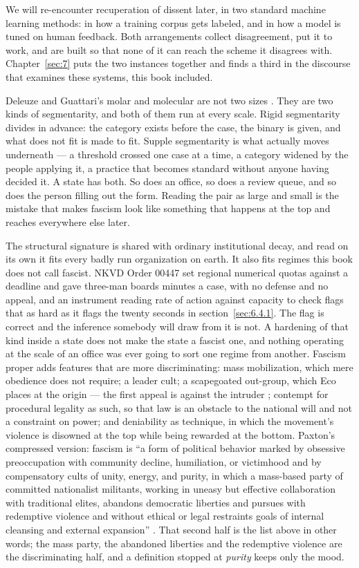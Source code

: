 We will re-encounter recuperation of dissent later, in two standard machine learning methods: in how a training corpus gets labeled, and in how a model is tuned on human feedback. Both arrangements collect disagreement, put it to work, and are built so that none of it can reach the scheme it disagrees with. Chapter~\ref{sec:7} puts the two instances together and finds a third in the discourse that examines these systems, this book included.

Deleuze and Guattari's molar and molecular are not two sizes \autocite{deleuze1987plateaus}. They are two kinds of segmentarity, and both of them run at every scale. Rigid segmentarity divides in advance: the category exists before the case, the binary is given, and what does not fit is made to fit. Supple segmentarity is what actually moves underneath — a threshold crossed one case at a time, a category widened by the people applying it, a practice that becomes standard without anyone having decided it. A state has both. So does an office, so does a review queue, and so does the person filling out the form. Reading the pair as large and small is the mistake that makes fascism look like something that happens at the top and reaches everywhere else later.

The structural signature is shared with ordinary institutional decay, and read on its own it fits every badly run organization on earth. It also fits regimes this book does not call fascist. NKVD Order 00447 set regional numerical quotas against a deadline and gave three-man boards minutes a case, with no defense and no appeal, and an instrument reading rate of action against capacity to check flags that as hard as it flags the twenty seconds in section~\ref{sec:6.4.1}. The flag is correct and the inference somebody will draw from it is not. A hardening of that kind inside a state does not make the state a fascist one, and nothing operating at the scale of an office was ever going to sort one regime from another. Fascism proper adds features that are more discriminating: mass mobilization, which mere obedience does not require; a leader cult; a scapegoated out-group, which Eco places at the origin — the first appeal is against the intruder \autocite{eco1995urfascism}; contempt for procedural legality as such, so that law is an obstacle to the national will and not a constraint on power; and deniability as technique, in which the movement's violence is disowned at the top while being rewarded at the bottom. Paxton's compressed version: fascism is “a form of political behavior marked by obsessive preoccupation with community decline, humiliation, or victimhood and by compensatory cults of unity, energy, and purity, in which a mass-based party of committed nationalist militants, working in uneasy but effective collaboration with traditional elites, abandons democratic liberties and pursues with redemptive violence and without ethical or legal restraints goals of internal cleansing and external expansion” \autocite{paxton2004anatomy}. That second half is the list above in other words; the mass party, the abandoned liberties and the redemptive violence are the discriminating half, and a definition stopped at \emph{purity} keeps only the mood.

